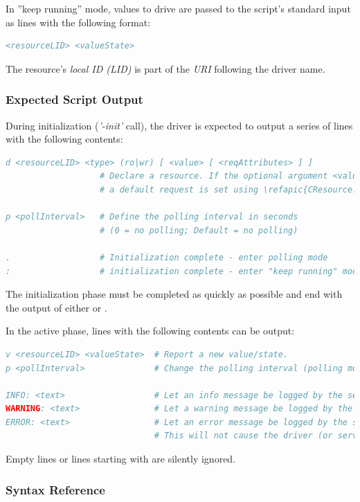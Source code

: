 \documentclass[12pt,english,parskip=half,headheight=19pt]{scrreprt}
\newcommand{\lst}[1]{\colorbox{lstbackground}{\footnotesize\code{#1}}}
\newcommand{\refapic}[1]{\href{home2l-api_c/index.html}{\mbox{\texttt{#1}}}}            %
\begin{document}
In ''keep running'' mode, values to drive are passed to the script's standard input as lines with the following format:
\begin{lstlisting}[language=comments]
<resourceLID> <valueState>
\end{lstlisting}

The resource's \textit{local ID (LID)} is part of the \textit{URI} following the driver name.


\subsubsection*{Expected Script Output}

During initialization (\textit{'-init'} call), the driver is expected
to output a series of lines with the following contents:
\begin{lstlisting}[language=comments]
d <resourceLID> <type> (ro|wr) [ <value> [ <reqAttributes> ] ]
                   # Declare a resource. If the optional argument <value> is supplied,
                   # a default request is set using \refapic{CResource::SetDefault()}.

p <pollInterval>   # Define the polling interval in seconds
                   # (0 = no polling; Default = no polling)

.                  # Initialization complete - enter polling mode
:                  # initialization complete - enter "keep running" mode
\end{lstlisting}

The initialization phase must be completed as quickly as possible and end with the output of either \lst{.} or \lst{:}.

In the active phase, lines with the following contents can be output:
\begin{lstlisting}[language=comments]
v <resourceLID> <valueState>  # Report a new value/state.
p <pollInterval>              # Change the polling interval (polling mode only).

INFO: <text>                  # Let an info message be logged by the server.
WARNING: <text>               # Let a warning message be logged by the server.
ERROR: <text>                 # Let an error message be logged by the server.
                              # This will not cause the driver (or server) to stop.
\end{lstlisting}

Empty lines or lines starting with \lst{#} are silently ignored.


\subsubsection*{Syntax Reference}
\end{document}
